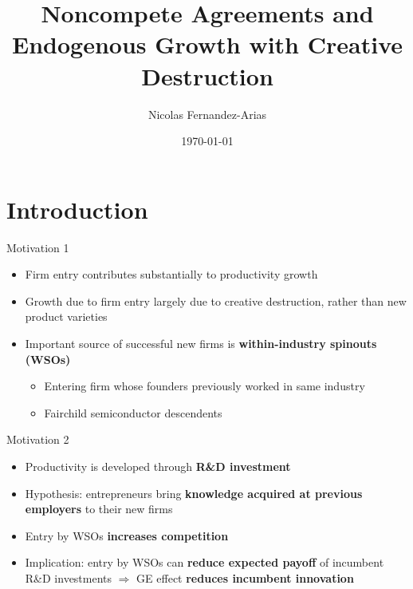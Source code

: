 \documentclass[english,usenames,dvipsnames]{beamer}
\title{Noncompete Agreements and Endogenous Growth with Creative Destruction}
\author{Nicolas Fernandez-Arias}
\date{\today }
\begin{document}
\maketitle

\section{Introduction}

\begin{frame}{Motivation 1}
\begin{itemize}
	\item Firm entry contributes substantially to productivity growth
	\item Growth due to firm entry largely due to creative destruction, rather than new product varieties
	\item Important source of successful new firms is \alert{\textbf{within-industry spinouts (WSOs)}}
	\begin{itemize}
		\item Entering firm whose founders previously worked in same industry 
		\hyperlink{spinouts_facts_from_literature}{}
		\item Fairchild semiconductor descendents \hyperlink{fairchildren_early}{}
	\end{itemize}
\end{itemize}
\end{frame}

\begin{frame}{Motivation 2}
\begin{itemize}
	\item Productivity is developed through \alert{\textbf{R\&D investment}}
	\item Hypothesis: entrepreneurs bring \alert{\textbf{\textbf{knowledge acquired at previous employers}}} to their new firms
	\item Entry by WSOs \alert{\textbf{increases competition}}
	\item Implication: entry by WSOs can \alert{\textbf{reduce expected payoff}} of incumbent R\&D investments $\Rightarrow$ GE effect \alert{\textbf{reduces incumbent innovation}}
\end{itemize}
\end{frame}
\end{document}
